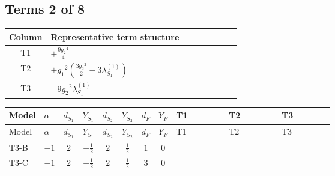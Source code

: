 \documentclass[8pt]{article}
\begin{document}
\begin{landscape}
\subsection*{Terms 2 of 8}
\begin{center}
\begin{tabular}{@{}c >{\raggedright\arraybackslash}p{0.82\linewidth}@{}}
\toprule
Column & Representative term structure \\
\midrule
T1 & \(\displaystyle +\frac{9 {g_2}^4}{4}\) \\
\midrule
T2 & \(\displaystyle +{g_1}^2 \left(\frac{3 {g_2}^2}{2}-3 {\lambda_{S_1}^{(1)}}\right)\) \\
\midrule
T3 & \(\displaystyle -9 {g_2}^2 {\lambda_{S_1}^{(1)}}\) \\
\midrule
\bottomrule
\end{tabular}
\end{center}
\smallskip
\tiny
\begin{longtable}{@{}llcccccc >{\raggedright\arraybackslash}p{0.21\linewidth} >{\raggedright\arraybackslash}p{0.21\linewidth} >{\raggedright\arraybackslash}p{0.21\linewidth}@{}}
\toprule
Model & $\alpha$ & $d_{S_1}$ & $Y_{S_1}$ & $d_{S_2}$ & $Y_{S_2}$ & $d_F$ & $Y_F$ & T1 & T2 & T3 \\
\midrule
\endfirsthead
\toprule
Model & $\alpha$ & $d_{S_1}$ & $Y_{S_1}$ & $d_{S_2}$ & $Y_{S_2}$ & $d_F$ & $Y_F$ & T1 & T2 & T3 \\
\midrule
\endhead
T3-B & $-1$ & $2$ & $-\frac{1}{2}$ & $2$ & $\frac{1}{2}$ & $1$ & $0$ & \scriptsize\adjustbox{max width=\linewidth}{$\begin{gathered} +\frac{9 {g_2}^4}{4}\end{gathered}$} & \scriptsize\adjustbox{max width=\linewidth}{$\begin{gathered} +{g_1}^2 \left(\frac{3 {g_2}^2}{2}-3 {\lambda_{S_1}^{(1)}}\right)\end{gathered}$} & \scriptsize\adjustbox{max width=\linewidth}{$\begin{gathered} -9 {g_2}^2 {\lambda_{S_1}^{(1)}}\end{gathered}$} \\
\midrule
T3-C & $-1$ & $2$ & $-\frac{1}{2}$ & $2$ & $\frac{1}{2}$ & $3$ & $0$ & \scriptsize\adjustbox{max width=\linewidth}{$\begin{gathered} +\frac{9 {g_2}^4}{4}\end{gathered}$} & \scriptsize\adjustbox{max width=\linewidth}{$\begin{gathered} +{g_1}^2 \left(\frac{3 {g_2}^2}{2}-3 {\lambda_{S_1}^{(1)}}\right)\end{gathered}$} & \scriptsize\adjustbox{max width=\linewidth}{$\begin{gathered} -9 {g_2}^2 {\lambda_{S_1}^{(1)}}\end{gathered}$} \\

\end{longtable}
\end{landscape}
\end{document}
